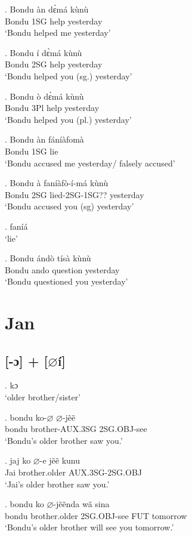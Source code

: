 \documentclass{assets/fieldnotes}
\begin{document}
\exg. Bondu àn dɛ̀má kùnù\\
Bondu   1SG  help   yesterday\\ 
`Bondu helped me yesterday'

\exg. Bondu í dɛ̀má kùnù\\
Bondu 2SG help yesterday\\
`Bondu helped you (sg.) yesterday'

\exg. Bondu ò dɛ̀má kùnù\\
Bondu 3Pl help yesterday\\
`Bondu helped you (pl.) yesterday' 

\exg. Bondu àn fáníàfomà \\
Bondu 1SG lie \\
`Bondu accused me yesterday/ falsely accused'

\exg. Bondu à faníàfò-í-má kùnù\\
Bondu 2SG lied-2SG-1SG??  yesterday\\
`Bondu accused you (sg) yesterday'

\ex. faníá\\
`lie'
 

\ex. Bondu ándò tísà kùnù\\
Bondu ando question yesterday\\
`Bondu questioned you yesterday'


\section{Jan}

\subsection{[-ɔ] + [$\varnothing$í]}

\ex. kɔ \\
`older brother/sister'

\exg. bondu ko-$\varnothing$ $\varnothing$-jẽẽ  \\
bondu brother-AUX.3SG 2SG.OBJ-see \\
`Bondu's older brother saw you.'


\exg. jaj ko $\varnothing$-e jẽẽ kunu \\
Jai brother.older  AUX.3SG-2SG.OBJ \\
`Jai's older brother saw you.'


\exg. bondu ko $\varnothing$-jẽẽnda wã sina \\
bondu brother.older 2SG.OBJ-see FUT tomorrow \\
`Bondu's older brother will see you tomorrow.'
\end{document}
